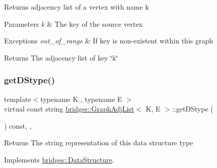 Returns adjacency list of a vertex with name k


\begin{DoxyParams}{Parameters}
{\em k} & The key of the source vertex \\
\hline
\end{DoxyParams}

\begin{DoxyExceptions}{Exceptions}
{\em out\+\_\+of\+\_\+range} & If key is non-\/existent within this graph\\
\hline
\end{DoxyExceptions}
\begin{DoxyReturn}{Returns}
The adjacency list of key \char`\"{}k\char`\"{} 
\end{DoxyReturn}
\hypertarget{classbridges_1_1_graph_adj_list_af468c62b241894073ab58bed51581b7b}{}\label{classbridges_1_1_graph_adj_list_af468c62b241894073ab58bed51581b7b} 
\subsubsection{\texorpdfstring{get\+D\+Stype()}{getDStype()}}
{\footnotesize\ttfamily template$<$typename K , typename E $>$ \\
virtual const string \hyperlink{classbridges_1_1_graph_adj_list}{bridges\+::\+Graph\+Adj\+List}$<$ K, E $>$\+::get\+D\+Stype (\begin{DoxyParamCaption}{ }\end{DoxyParamCaption}) const\hspace{0.3cm}{\ttfamily [inline]}, {\ttfamily [override]}, {\ttfamily [virtual]}}

\begin{DoxyReturn}{Returns}
The string representation of this data structure type 
\end{DoxyReturn}


Implements \hyperlink{classbridges_1_1_data_structure_a957a63b106e340bc753620c650632bdc}{bridges\+::\+Data\+Structure}.

\hypertarget{classbridges_1_1_graph_adj_list_a0fc1d0a9ebe610a5970dfc94642e5ff9}{}\label{classbridges_1_1_graph_adj_list_a0fc1d0a9ebe610a5970dfc94642e5ff9} 
